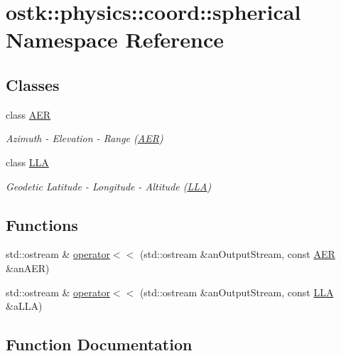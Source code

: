 \hypertarget{namespaceostk_1_1physics_1_1coord_1_1spherical}{}\section{ostk\+:\+:physics\+:\+:coord\+:\+:spherical Namespace Reference}
\label{namespaceostk_1_1physics_1_1coord_1_1spherical}
\subsection*{Classes}
\begin{DoxyCompactItemize}
\item 
class \hyperlink{classostk_1_1physics_1_1coord_1_1spherical_1_1_a_e_r}{A\+ER}
\begin{DoxyCompactList}\small\item\em Azimuth -\/ Elevation -\/ Range (\hyperlink{classostk_1_1physics_1_1coord_1_1spherical_1_1_a_e_r}{A\+ER}) \end{DoxyCompactList}\item 
class \hyperlink{classostk_1_1physics_1_1coord_1_1spherical_1_1_l_l_a}{L\+LA}
\begin{DoxyCompactList}\small\item\em Geodetic Latitude -\/ Longitude -\/ Altitude (\hyperlink{classostk_1_1physics_1_1coord_1_1spherical_1_1_l_l_a}{L\+LA}) \end{DoxyCompactList}\end{DoxyCompactItemize}
\subsection*{Functions}
\begin{DoxyCompactItemize}
\item 
std\+::ostream \& \hyperlink{namespaceostk_1_1physics_1_1coord_1_1spherical_af33c974b46dff47bb03a4ed4bfcd6778}{operator$<$$<$} (std\+::ostream \&an\+Output\+Stream, const \hyperlink{classostk_1_1physics_1_1coord_1_1spherical_1_1_a_e_r}{A\+ER} \&an\+A\+ER)
\item 
std\+::ostream \& \hyperlink{namespaceostk_1_1physics_1_1coord_1_1spherical_ac3565b72aff3f64ab663ce438a516a30}{operator$<$$<$} (std\+::ostream \&an\+Output\+Stream, const \hyperlink{classostk_1_1physics_1_1coord_1_1spherical_1_1_l_l_a}{L\+LA} \&a\+L\+LA)
\end{DoxyCompactItemize}


\subsection{Function Documentation}
\mbox{\label{namespaceostk_1_1physics_1_1coord_1_1spherical_ac3565b72aff3f64ab663ce438a516a30}} 
